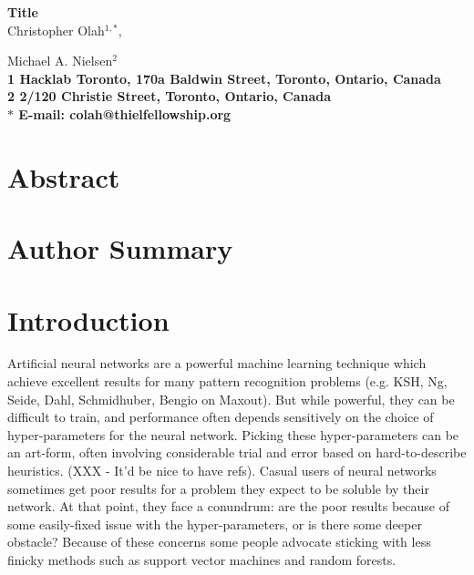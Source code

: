 \documentclass[10pt]{article}
\date{}
\begin{document}
\begin{flushleft}
{\Large
\textbf{Title}
}
%
%
% 
%
%
%
%
%
%
\\
Christopher Olah$^{1,\ast}$, 

Michael A. Nielsen$^{2}$
\\
\bf{1} Hacklab Toronto, 170a Baldwin Street, Toronto, Ontario, Canada
\\
\bf{2} 2/120 Christie Street, Toronto, Ontario, Canada
\\
$\ast$ E-mail: colah@thielfellowship.org

\end{flushleft}

\section*{Abstract}

\section*{Author Summary}

\section*{Introduction}

%
%
Artificial neural networks are a powerful machine learning technique
which achieve excellent results for many pattern recognition problems
(e.g. KSH, Ng, Seide, Dahl, Schmidhuber, Bengio on Maxout).  But while
powerful, they can be difficult to train, and performance often
depends sensitively on the choice of hyper-parameters for the neural
network.  Picking these hyper-parameters can be an art-form, often
involving considerable trial and error based on hard-to-describe
heuristics. (XXX - It'd be nice to have refs). Casual users of neural
networks sometimes get poor results for a problem they expect to be
soluble by their network.  At that point, they face a conundrum: are
the poor results because of some easily-fixed issue with the
hyper-parameters, or is there some deeper obstacle?  Because of these
concerns some people advocate sticking with less finicky methods such
as support vector machines and random forests.
\end{document}
